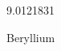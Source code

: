 \documentclass[12pt]{article}
\begin{document}
\hfill{}
\vfill
\begin{center}
  {\fontsize{50}{60}
  }

  \vspace{1em}

  9.0121831

Beryllium
\end{center}
\vfill
\end{document}
